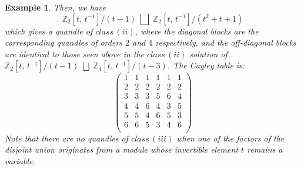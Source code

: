 \documentclass[a4paper,12pt]{article}
\newtheorem{example}{Example}[section]
\begin{document}
\begin{example}
Then, we have 
$$\mathbb{Z}_2  [t, \, t^{-1}]   / (t-1) \; \bigsqcup  \; \mathbb{Z}_2  [t, \, t^{-1}]   / (t^2 + t + 1)$$  
which gives a quandle of $class \, (ii)$, where the diagonal blocks are the corresponding quandles of orders $2$ and $4$ respectively, and the off-diagonal blocks are identical to those seen above in the $class \, (ii)$  solution of  $\mathbb{Z}_2  [t, \, t^{-1}]   / (t-1) \; \bigsqcup  \; \mathbb{Z}_4  [t, \, t^{-1}]   / (t-3)$. The Cayley table is:     
$$  \left(
\begin{array}{cccccc}
 1 & 1 & 1 & 1 & 1 & 1 \\
 2 & 2 & 2 & 2 & 2 & 2 \\
 3 & 3 & 3 & 5 & 6 & 4 \\
 4 & 4 & 6 & 4 & 3 & 5 \\
 5 & 5 & 4 & 6 & 5 & 3 \\
 6 & 6 & 5 & 3 & 4 & 6 \\
\end{array}
\right)  $$
Note that there are no quandles of $class \, (iii)$  when one of the factors of the disjoint union originates from a module whose invertible element $t$ remains a variable. 

\end{example}
\end{document}
